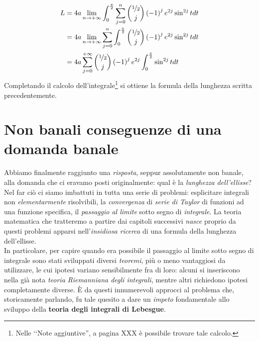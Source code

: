\begin{align*}
	L&=4a\lim_{n\to +\infty}\int_{0}^{\frac{\pi}{2}}\sum_{j=0}^{n}\binom{\nicefrac{1}{2}}{j}\left(-1\right)^je^{2j}\sin^{2j}tdt\\
	&=4a\lim_{n\to +\infty}\sum_{j=0}^{n}\int_{0}^{\frac{\pi}{2}}\binom{\nicefrac{1}{2}}{j}\left(-1\right)^je^{2j}\sin^{2j}tdt\\
	&=4a\sum_{j=0}^{+\infty}\binom{\nicefrac{1}{2}}{j}\left(-1\right)^je^{2j}\int_{0}^{\frac{\pi}{2}}\sin^{2j}tdt
\end{align*}
Completando il calcolo dell'integrale\footnote{Nelle ‘‘Note aggiuntive'', a pagina XXX è possibile trovare tale calcolo.} si ottiene la formula della lunghezza scritta precedentemente.\\
\section{Non banali conseguenze di una domanda banale}
Abbiamo finalmente raggiunto una \textit{risposta}, seppur assolutamente non banale, alla domanda che ci eravamo posti originalmente: qual è la \textit{lunghezza dell'ellisse}? Nel far ciò ci siamo imbattuti in tutta una serie di problemi: esplicitare integrali non \textit{elementarmente} risolvibili, la \textit{convergenza} di \textit{serie di Taylor} di funzioni ad una funzione specifica, il \textit{passaggio al limite} sotto segno di \textit{integrale}.
La teoria matematica che tratteremo a partire dai capitoli successivi \textit{nasce} proprio da questi problemi apparsi nell'\textit{insidiosa ricerca} di una formula della lunghezza dell'ellisse.\\
In particolare, per capire quando era possibile il passaggio al limite sotto segno di integrale sono stati sviluppati diversi \textit{teoremi}, più o meno vantaggiosi da utilizzare, le cui ipotesi variano sensibilmente fra di loro: alcuni si inseriscono nella già nota \textit{teoria Riemanniana degli integrali}, mentre altri richiedono ipotesi completamente diverse. È da questi innumerevoli approcci al problema che, storicamente parlando, fu tale quesito a dare un \textit{impeto} fondamentale allo sviluppo della \textbf{teoria degli integrali di Lebesgue}.
